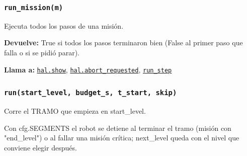 \subsubsection{\texttt{run\_\allowbreak{}mission(m)}}\label{fn:autonomous:run-mission}
\noindent Ejecuta todos los pasos de una misión.

\par{}\par\smallskip
\noindent\textbf{Devuelve:} True si todos los pasos terminaron bien (False al primer paso que falla o si se pidió parar).\par
\noindent\textbf{Llama a:} \hyperref[fn:hal:show]{\texttt{hal.show}}, \hyperref[fn:hal:abort-requested]{\texttt{hal.abort\_\allowbreak{}requested}}, \hyperref[fn:autonomous:run-step]{\texttt{run\_\allowbreak{}step}}\par

\subsubsection{\texttt{run(start\_\allowbreak{}level, budget\_\allowbreak{}s, t\_\allowbreak{}start, skip)}}\label{fn:autonomous:run}
\noindent Corre el TRAMO que empieza en start\_level.

Con cfg.SEGMENTS el robot se detiene al terminar el tramo (misión con "end\_level") o al fallar una misión crítica; next\_level queda con el nivel que conviene elegir después.

